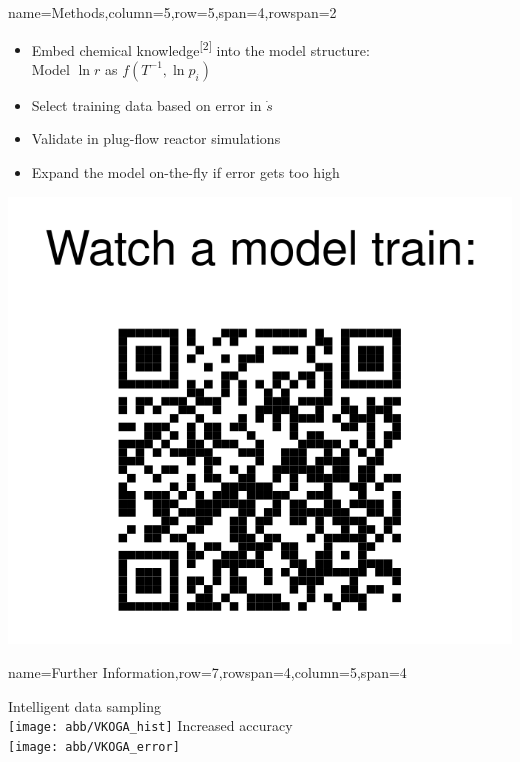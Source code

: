 \documentclass[
	accentcolor=3c,
	boxstyle=colored, %
	colorback=false,
	title=small
	]{tudasciposter}
\begin{document}
\begin{tcbposter}[
	poster={
		columns=8,
		rows=12,
		spacing=1cm,
	},]
\begin{posterboxenv}[title=2. Methods]{name=Methods,column=5,row=5,span=4,rowspan=2}
	\begin{minipage}{0.675\textwidth}
	\begin{itemize}
		\item Embed chemical knowledge\textsuperscript{[2]} into the model structure:\\
		Model $\ln r$ as $f(T^{-1}, \ln p_i)$
		\item Select training data based on error in $\dot{s}$
		\item Validate in plug-flow reactor simulations
		\item Expand the model on-the-fly if error gets too high
	\end{itemize}
	\end{minipage}
	\begin{minipage}{0.3\textwidth}
		\includegraphics[width=.9\textwidth]{abb/QR_reference}
	\end{minipage}
\end{posterboxenv}

\begin{posterboxenv}{name=Further Information,row=7,rowspan=4,column=5,span=4}
	\begin{multicols}{2}
		{\Large \centering Intelligent data sampling\\}
		\vspace{2cm}
		\texttt{[image: abb/VKOGA\_hist]}
		\columnbreak
		{\Large \centering Increased accuracy\\}
		\vspace{2cm}
		\texttt{[image: abb/VKOGA\_error]} %
	\end{multicols}	
\end{posterboxenv}


\end{tcbposter}
\end{document}
